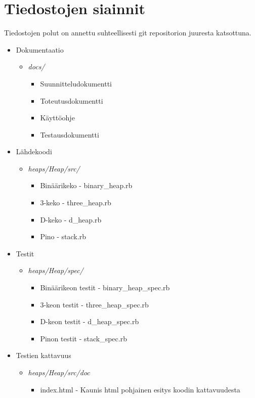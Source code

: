 \documentclass[a4paper,12pt]{article}
\begin{document}
\section{Tiedostojen siainnit}
Tiedostojen polut on annettu suhteellisesti git repositorion juuresta katsottuna.
\begin{itemize}
\item Dokumentaatio
\begin{itemize}
\item \emph{docs/} 
\begin{itemize}
\item Suunnitteludokumentti
\item Toteutusdokumentti
\item Käyttöohje
\item Testausdokumentti
\end{itemize}
\end{itemize}

\item Lähdekoodi
\begin{itemize}
\item \emph{heaps/Heap/src/} 
\begin{itemize}
\item Binäärikeko - binary\_heap.rb
\item 3-keko - three\_heap.rb
\item D-keko - d\_heap.rb
\item Pino - stack.rb
\end{itemize}
\end{itemize}

\item Testit
\begin{itemize}
\item \emph{heaps/Heap/spec/} 
\begin{itemize}
\item Binäärikeon testit - binary\_heap\_spec.rb
\item 3-keon testit - three\_heap\_spec.rb
\item D-keon testit - d\_heap\_spec.rb
\item Pinon testit - stack\_spec.rb
\end{itemize}
\end{itemize}

\item Testien kattavuus
\begin{itemize}
\item \emph{heaps/Heap/src/doc} 
\begin{itemize}
\item index.html - Kaunis html pohjainen esitys koodin kattavuudesta
\end{itemize}
\end{itemize}

\end{itemize}
\end{document}
